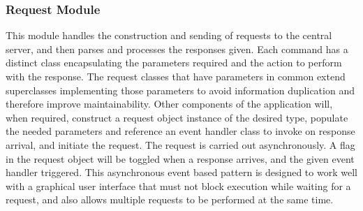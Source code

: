 \subsubsection{Request Module}
This module handles the construction and sending of requests to the central server, and then parses and processes the responses given. Each command has a distinct class encapsulating the parameters required and the action to perform with the response. The request classes that have parameters in common extend superclasses implementing those parameters to avoid information duplication and therefore improve maintainability. Other components of the application will, when required, construct a request object instance of the desired type, populate the needed parameters and reference an event handler class to invoke on response arrival, and initiate the request. The request is carried out asynchronously. A flag in the request object will be toggled when a response arrives, and the given event handler triggered. This asynchronous event based pattern is designed to work well with a graphical user interface that must not block execution while waiting for a request, and also allows multiple requests to be performed at the same time.

